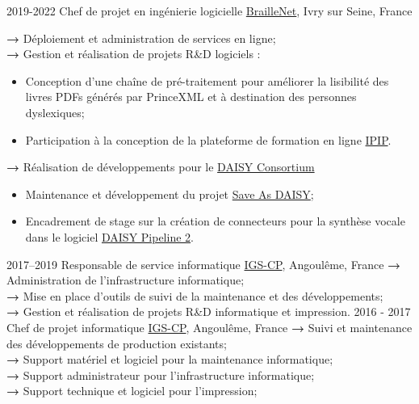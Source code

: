 \documentclass[]{friggeri-cv-a4} %
\begin{document}
\begin{entrylist}
{\begin{itemize}
\end{itemize}
}
\entry
{2019-2022}
{Chef de projet en ingénierie logicielle}
{\href{https://www.braillenet.org/}{BrailleNet}, Ivry sur Seine, France}
{
\textbf{→ }Déploiement et administration de services en ligne;\\
\textbf{→ }Gestion et réalisation de projets R\&D logiciels :
\begin{itemize}
\item Conception d'une chaîne de pré-traitement pour améliorer la lisibilité des livres PDFs générés par PrinceXML et à destination des personnes dyslexiques;
\item Participation à la conception de la plateforme de formation en ligne \href{https://github.com/SIDPT/Claroline}{IPIP}.
\end{itemize}
\textbf{→ }Réalisation de développements pour le \href{https://daisy.org}{DAISY Consortium}
\begin{itemize}
\item Maintenance et développement du projet \href{https://github.com/daisy/word-save-as-daisy}{Save As DAISY};
\item Encadrement de stage sur la création de connecteurs pour la synthèse vocale dans le logiciel \href{https://github.com/daisy/pipeline}{DAISY Pipeline 2}.
\end{itemize}
}
\entry
{2017--2019}
{Responsable de service informatique}
{\href{http://www.igs-cp.fr/}{IGS-CP}, Angoulême, France}
{
\textbf{→ }Administration de l’infrastructure informatique;\\
\textbf{→ }Mise en place d’outils de suivi de la maintenance et des développements;\\
\textbf{→ }Gestion et réalisation de projets R\&D informatique et impression.
}
\entry
{2016 - 2017}
{Chef de projet informatique}
{\href{http://www.igs-cp.fr/}{IGS-CP}, Angoulême, France}
{
\textbf{→ }Suivi et maintenance des développements de production existants;\\
\textbf{→ }Support matériel et logiciel pour la maintenance informatique;\\
\textbf{→ }Support administrateur pour l’infrastructure informatique;\\
\textbf{→ }Support technique et logiciel pour l’impression;\\
}
\end{entrylist}
\end{document}
